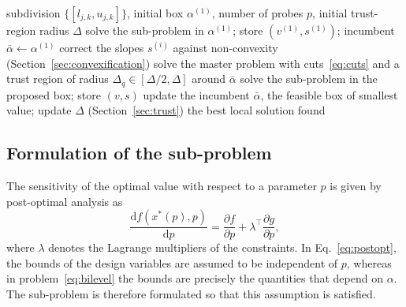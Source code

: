 \documentclass[pdflatex,sn-basic]{sn-jnl}
\begin{document}
\begin{algorithm}[t]
  \caption{Box-subdivision outer approximation}\label{alg:bsoa}
  \begin{algorithmic}[1]
    \Require subdivision $\{[l_{j,k},u_{j,k}]\}$, initial box $\alpha^{(1)}$,
      number of probes $p$, initial trust-region radius $\Delta$
    \State solve the sub-problem in $\alpha^{(1)}$; store $(v^{(1)}, s^{(1)})$;
      incumbent $\bar\alpha \gets \alpha^{(1)}$
      \State correct the slopes $s^{(i)}$ against non-convexity
        (Section~\ref{sec:convexification})
        \State solve the master problem with cuts~\eqref{eq:cuts} and a trust
          region of radius $\Delta_q \in [\Delta/2, \Delta]$ around $\bar\alpha$
        \State solve the sub-problem in the proposed box; store $(v, s)$
      \EndFor
      \State update the incumbent $\bar\alpha$, the feasible box of smallest
        value; update $\Delta$ (Section~\ref{sec:trust})
    \EndWhile
    \State \Return the best local solution found
  \end{algorithmic}
\end{algorithm}

\subsection{Formulation of the sub-problem}\label{sec:formulations}

The sensitivity of the optimal value with respect to a parameter $p$ is given by
post-optimal analysis as
\begin{equation}\label{eq:postopt}
  \frac{\mathrm{d} f(x^\ast(p), p)}{\mathrm{d}p}
  = \frac{\partial f}{\partial p} + \lambda^\top \frac{\partial g}{\partial p},
\end{equation}
where $\lambda$ denotes the Lagrange multipliers of the constraints. In
Eq.~\eqref{eq:postopt}, the bounds of the design variables are assumed to be
independent of $p$, whereas in problem~\eqref{eq:bilevel} the bounds are
precisely the quantities that depend on $\alpha$. The sub-problem is therefore
formulated so that this assumption is satisfied.
\end{document}
